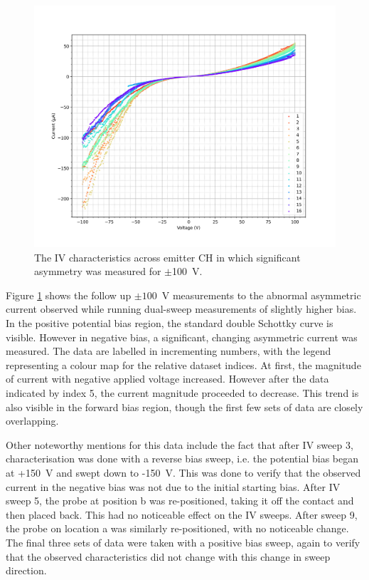 \begin{refsection}
\begin{figure}[H]
    \centering
    \includegraphics[width=\linewidth]{Chapter7/Figs/Raster/Emitters/124-145_iv.png}
    \caption{The IV characteristics across emitter CH in which significant asymmetry was measured for $\pm$100~\si{\volt}.}
    \label{fig:e_ch_124-145_iv}
\end{figure}

Figure \ref{fig:e_ch_124-145_iv} shows the follow up $\pm100$~\si{\volt} measurements to the abnormal asymmetric current observed while running dual-sweep measurements of slightly higher bias. In the positive potential bias region, the standard double Schottky curve is visible. However in negative bias, a significant, changing asymmetric current was measured. The data are labelled in incrementing numbers, with the legend representing a colour map for the relative dataset indices. At first, the magnitude of current with negative applied voltage increased. However after the data indicated by index 5, the current magnitude proceeded to decrease. This trend is also visible in the forward bias region, though the first few sets of data are closely overlapping.

Other noteworthy mentions for this data include the fact that after IV sweep 3, characterisation was done with a reverse bias sweep, i.e. the potential bias began at +150~\si{\volt} and swept down to -150~\si{\volt}. This was done to verify that the observed current in the negative bias was not due to the initial starting bias. After IV sweep 5, the probe at position b was re-positioned, taking it off the contact and then placed back. This had no noticeable effect on the IV sweeps. After sweep 9, the probe on location a was similarly re-positioned, with no noticeable change. The final three sets of data were taken with a positive bias sweep, again to verify that the observed characteristics did not change with this change in sweep direction.


\end{refsection}
